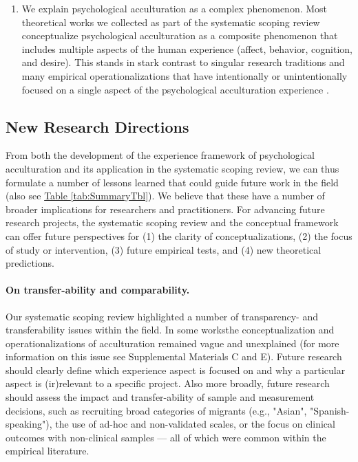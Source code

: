 \documentclass[man, 12pt, a4paper, mask]{apa7}
\newcommand{\tblref}[2][]{\hyperref[#2]{Table \ref*{#2}#1}}
\providecommand{\DIFaddtex}[1]{{\protect\color{blue}\uwave{#1}}} %
\providecommand{\DIFaddbegin}{} %
\providecommand{\DIFaddend}{} %
\providecommand{\DIFadd}[1]{\texorpdfstring{\DIFaddtex{#1}}{#1}} %
\newcommand{\DIFaddincludegraphics}[2][]{{\color{blue}\fbox{\DIFOincludegraphics[#1]{#2}}}} %
\DeclareRobustCommand{\DIFaddbegin}{\DIFOaddbegin \let\includegraphics\DIFaddincludegraphics} %
\DeclareRobustCommand{\DIFaddend}{\DIFOaddend \let\includegraphics\DIFOincludegraphics} %
\begin{document}
\begin{enumerate}
\item We explain psychological acculturation as a complex phenomenon. Most theoretical works we collected as part of the systematic scoping review conceptualize psychological acculturation as a composite phenomenon that includes multiple aspects of the human experience (affect, behavior, cognition, and desire). This stands in stark contrast to singular research traditions and many empirical operationalizations that have intentionally or unintentionally focused on a single aspect of the psychological acculturation experience \citep[also see][]{Ward2001}.
\end{enumerate}

\subsection{New Research Directions}
From both the development of the experience framework of psychological acculturation and its application in the systematic scoping review, we can thus formulate a number of lessons learned that could guide future work in the field (also see \tblref{tab:SummaryTbl}). We believe that these have a number of broader implications for researchers and practitioners.
For advancing future research projects, the systematic scoping review and the conceptual framework can offer future perspectives for (1) the clarity of conceptualizations, (2) the focus of study or intervention, (3) future empirical tests, and (4) new theoretical predictions. 

\paragraph{On transfer-ability and comparability.} Our systematic scoping review highlighted a number of transparency- and transferability issues within the field. In some works\DIFaddbegin \DIFadd{, }\DIFaddend the conceptualization and operationalizations of acculturation remained vague and unexplained (for more information on this issue see Supplemental Materials C and E). Future research should clearly define which experience aspect is focused on and why a particular aspect is (ir)relevant to a specific project. Also more broadly, future research should assess the impact and transfer-ability of sample and measurement decisions, such as recruiting broad categories of migrants (e.g., "Asian", "Spanish-speaking"), the use of ad-hoc and non-validated scales, or the focus on clinical outcomes with non-clinical samples --- all of which were common within the empirical literature.
\end{document}
